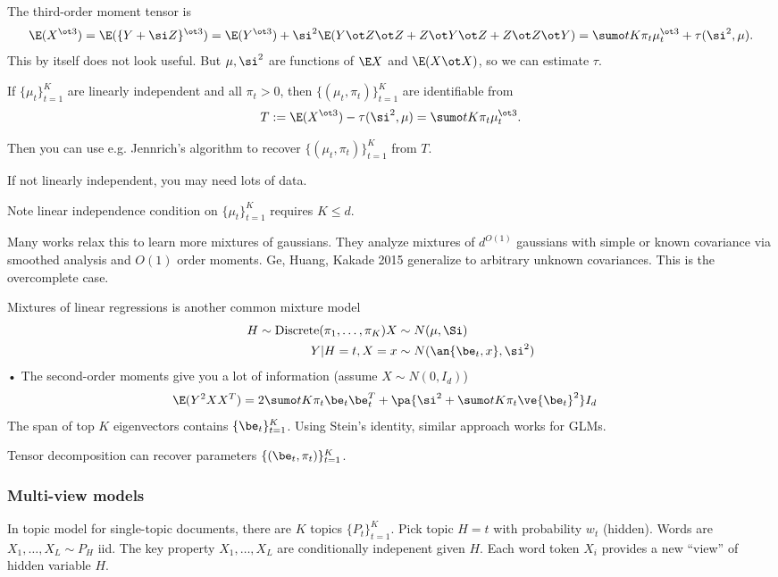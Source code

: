 The third-order moment tensor is
$$
\E(X^{\ot 3}) = \E(\{Y+\si Z\}^{\ot 3}) = \E(Y^{\ot 3}) + \si^2 \E(Y\ot Z\ot Z + Z\ot Y \ot  Z + Z\ot Z\ot Y) = \sumo tK \pi_t \mu_t^{\ot 3} + \tau(\si^2, \mu).
$$
This by itself does not look useful.  But $\mu, \si^2$ are functions of $\E X$ and $\E(X\ot X)$, so we can estimate $\tau$. 
\begin{clm}
If $\{\mu_t\}_{t=1}^K$ are linearly independent and all $\pi_t>0$, then $\{(\mu_t, \pi_t)\}_{t=1}^K$ are identifiable from
$$
T:=\E(X^{\ot 3}) - \tau(\si^2,\mu) = \sumo tK \pi_t\mu_t^{\ot 3}.
$$
\end{clm}
Then you can use e.g. Jennrich's algorithm to recover $\{(\mu_t,\pi_t)\}_{t=1}^K$ from $T$.

If not linearly independent, you may need lots of data.

Note linear independence condition on $\{\mu_t\}_{t=1}^K$ requires $K\le d$.

Many works relax this to learn more mixtures of gaussians. They analyze mixtures of $d^{O(1)}$ gaussians with simple or known covariance via smoothed analysis and $O(1)$ order moments.
Ge, Huang, Kakade 2015 generalize to arbitrary unknown covariances. This is the overcomplete case.

Mixtures of linear regressions is another common mixture model
\begin{align}
H\sim \text{Discrete} (\pi_1,\ldots, \pi_K)
X&\sim N(\mu, \Si)\\
Y|H=t,X=x &\sim N(\an{\be_t,x},\si^2)
\end{align}•
The second-order moments give you a lot of information (assume $X\sim N(0,I_d)$)
\begin{align}
\E(Y^2 XX^T) & = 2\sumo tK \pi_t \be_t\be_t^T + \pa{
\si^2 + \sumo tK \pi_t \ve{\be_t}^2}I_d
\end{align}
The span of top $K$ eigenvectors contains $\{\be_t\}_{t=1}^K$.
Using Stein's identity, similar approach works for GLMs.


Tensor decomposition can recover parameters $\{(\be_t, \pi_t)\}_{t=1}^K$.


\subsubsection{Multi-view models}

In topic model for single-topic documents, there are $K$ topics $\{P_t\}_{t=1}^K$. Pick topic $H=t$ with probability $w_t$ (hidden). Words are $X_1,\ldots, X_L\sim P_H$ iid. The key property $X_1,\ldots, X_L$ are conditionally indepenent given $H$. Each word token $X_i$ provides a new ``view'' of hidden variable $H$.

